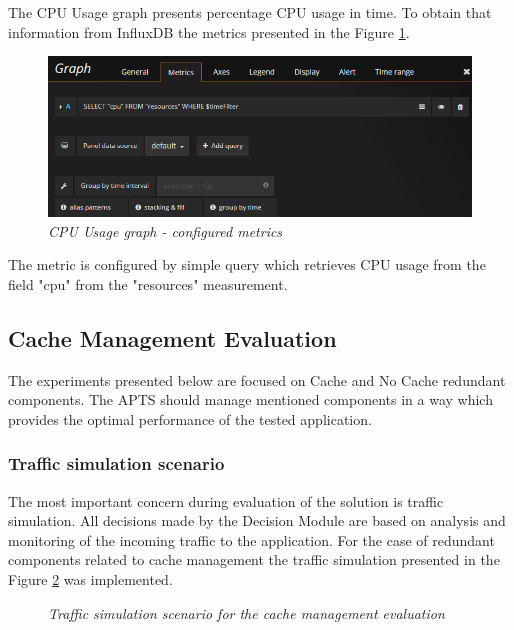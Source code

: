 \documentclass[12pt,a4paper]{article}
\begin{document}
The CPU Usage graph presents percentage CPU usage in time. To obtain that information from InfluxDB the metrics presented in the Figure \ref{figure:grafanametricscpu}. 

\begin{figure}[!htb]
\centering
\includegraphics[width=1\textwidth]{grafanametricscpu}
\caption{\textit{CPU Usage graph - configured metrics}} \label{figure:grafanametricscpu}
\end{figure}

The metric is configured by simple query which retrieves CPU usage from the field "cpu" from the "resources" measurement.  

\subsection{Cache Management Evaluation} \label{section:cachemenagementevaluation}

The experiments presented below are focused on Cache and No Cache redundant components. The APTS should manage mentioned components in a way which provides the optimal performance of the tested application.

\subsubsection{Traffic simulation scenario} \label{trafficcachesim}

The most important concern during evaluation of the solution is traffic simulation. All decisions made by the Decision Module are based on analysis and monitoring of the incoming traffic to the application. For the case of redundant components related to cache management the traffic simulation presented in the Figure \ref{trafficcache} was implemented.

\begin{figure}[!htb]
\caption{\textit{Traffic simulation scenario for the cache management evaluation}} \label{trafficcache}
\end{figure}
\end{document}
